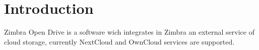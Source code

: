 \chapter{Introduction}

Zimbra Open Drive is a software wich integrates in Zimbra an external service of cloud storage,
currently NextCloud and OwnCloud services are supported.



